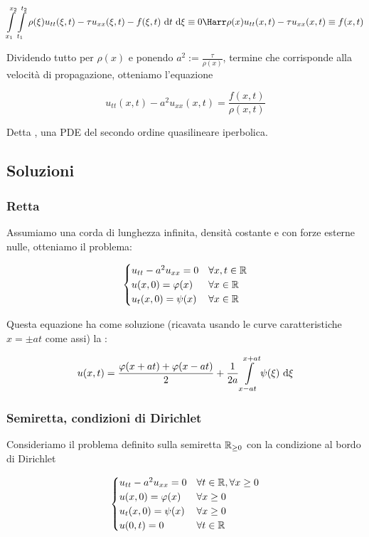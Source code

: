 \documentclass{article}
\begin{document}
\[ \intop_{x_1}^{x_2}\intop_{t_1}^{t_2} \rho(\xi) u_{tt}(\xi,t) - \tau u_{xx}(\xi,t) - f(\xi,t) \de t \de \xi \equiv 0 \Harr \rho(x) u_{tt}(x,t) - \tau u_{xx}(x,t)\equiv f(x,t) \]

Dividendo tutto per $\rho(x)$ e ponendo $a^2 := \frac{\tau}{\rho(x)}$, termine che corrisponde alla velocità di propagazione, otteniamo l'equazione

\[ u_{tt}(x,t) - a^2 u_{xx}(x,t) = \frac{f(x,t)}{\rho(x,t)} \]

Detta , una PDE del secondo ordine quasilineare iperbolica.

\subsection{Soluzioni}

\subsubsection{Retta}

Assumiamo una corda di lunghezza infinita, densità costante e con forze esterne nulle, otteniamo il problema:

\[ \begin{cases}
    u_{tt} - a^2 u_{xx} = 0 & \forall x,t \in \mathbb{R}\\
    u(x,0) = \varphi(x) & \forall x \in \mathbb{R}\\
    u_t(x,0) = \psi(x) & \forall x \in \mathbb{R}
\end{cases} \]

Questa equazione ha come soluzione (ricavata usando le curve caratteristiche $x = \pm at$ come assi) la :

\[ u(x,t) = \frac{\varphi(x+at) + \varphi(x-at) }{2} + \frac{1}{2a} \intop_{x-at}^{x+at} \psi(\xi)\de \xi\]

\subsubsection{Semiretta, condizioni di Dirichlet}

Consideriamo il problema definito sulla semiretta $\mathbb{R}_{\ge 0}$ con la condizione al bordo di Dirichlet

\[ \begin{cases}
    u_{tt} - a^2 u_{xx} = 0 & \forall t \in \mathbb{R}, \forall x \ge 0\\
    u(x,0) = \varphi(x) & \forall x \ge 0\\
    u_t(x,0) = \psi(x) & \forall x \ge 0\\
    u(0,t) = 0 & \forall t \in \mathbb{R}
\end{cases} \]
\end{document}
